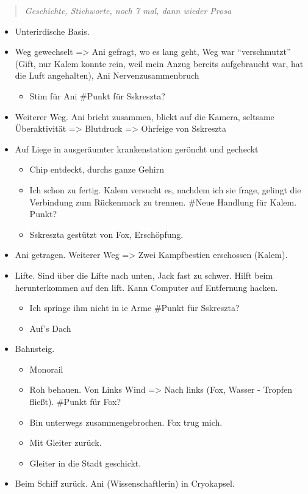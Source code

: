 \documentclass[11pt]{scrartcl}
\begin{document}
\begin{quote}
\emph{Geschichte, Stichworte, noch 7 mal, dann wieder Prosa}

\end{quote}
\begin{itemize}
\item
  Unterirdische Basis.
\item
  Weg gewechselt =\textgreater{} Ani gefragt, wo es lang geht, Weg war
  ``verschmutzt'' (Gift, nur Kalem konnte rein, weil mein Anzug bereits
  aufgebraucht war, hat die Luft angehalten), Ani Nervenzusammenbruch
  \begin{itemize}
  \item
    Stim für Ani \#Punkt für Sskreszta?
  \end{itemize}
\item
  Weiterer Weg. Ani bricht zusammen, blickt auf die Kamera, seltsame
  Überaktivität =\textgreater{} Blutdruck =\textgreater{} Ohrfeige von
  Sskreszta
\item
  Auf Liege in ausgeräumter krankenstation geröncht und gecheckt

  \begin{itemize}
  \item
    Chip entdeckt, durchs ganze Gehirn
  \item
    Ich schon zu fertig. Kalem versucht es, nachdem ich sie frage,
    gelingt die Verbindung zum Rückenmark zu trennen. \#Neue Handlung
    für Kalem. Punkt?
  \item
    Sskreszta gestützt von Fox, Erschöpfung.
  \end{itemize}
\item
  Ani getragen. Weiterer Weg =\textgreater{} Zwei Kampfbestien
  erschossen (Kalem).
\item
  Lifte. Sind über die Lifte nach unten, Jack fast zu schwer. Hilft beim
  herunterkommen auf den lift. Kann Computer auf Entfernung hacken.

  \begin{itemize}
  \item
    Ich springe ihm nicht in ie Arme \#Punkt für Sskreszta?
  \item
    Auf's Dach
  \end{itemize}
\item
  Bahnsteig.

  \begin{itemize}
  \item
    Monorail
  \item
    Roh behauen. Von Links Wind =\textgreater{} Nach links (Fox, Wasser
    - Tropfen fließt). \#Punkt für Fox?
  \item
    Bin unterwegs zusammengebrochen. Fox trug mich.
  \item
    Mit Gleiter zurück.
  \item
    Gleiter in die Stadt geschickt.
  \end{itemize}
\item
  Beim Schiff zurück. Ani (Wissenschaftlerin) in Cryokapsel.


\end{itemize}
\end{document}
